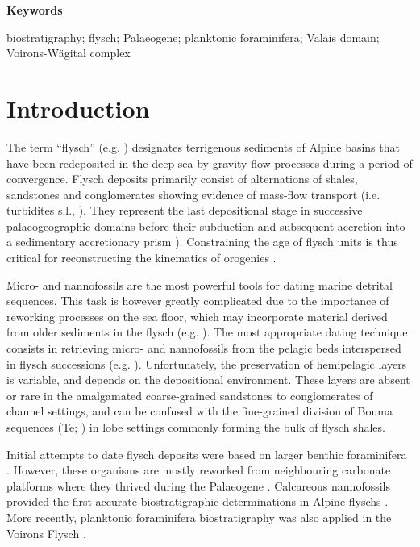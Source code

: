 \documentclass[twoside]{article}
\begin{document}
\begin{center}
{\small{\bf Keywords}\par
\smallskip
biostratigraphy; flysch; Palaeogene; planktonic foraminifera; Valais domain; Voirons-Wägital complex\par}
\end{center}

\section{Introduction}

The term “flysch” (e.g. \citealp{Studer1848,Wildi1987,Homewood1988}) designates terrigenous sediments of Alpine basins that have been redeposited in the deep sea by gravity-flow processes during a period of convergence. Flysch deposits primarily consist of alternations of shales, sandstones and conglomerates showing evidence of mass-flow transport (i.e. turbidites s.l., \citep{Mutti2009}). They represent the last depositional stage in successive palaeogeographic domains before their subduction and subsequent accretion into a sedimentary accretionary prism \citep{Kuenen1953,Homewood1988,Stampfli2002b}). Constraining the age of flysch units is thus critical for reconstructing the kinematics of orogenies \citep{Stampfli2002b,Stampfli2009,Handy2010}.\par
Micro- and nannofossils are the most powerful tools for dating marine detrital sequences. This task is however greatly complicated due to the importance of reworking processes on the sea floor, which may incorporate material derived from older sediments in the flysch (e.g. \citealp{Morel1980b,Mulder2001}). The most appropriate dating technique consists in retrieving micro- and nannofossils from the pelagic beds interspersed in flysch successions (e.g. \citealp{Ujetz1996}). Unfortunately, the preservation of hemipelagic layers is variable, and depends on the depositional environment. These layers are absent or rare in the amalgamated coarse-grained sandstones to conglomerates of channel settings, and can be confused with the fine-grained division of Bouma sequences (Te; \citealp{Bouma1962}) in lobe settings \citep{Mutti2003} commonly forming the bulk of flysch shales.\par
Initial attempts to date flysch deposits were based on larger benthic foraminifera \citep{Pilloud1936,Lombard1940a,Schaub1951,Rigassi1958,Cogulu1961,Schaub1965}. However, these organisms are mostly reworked from neighbouring carbonate platforms where they thrived during the Palaeogene \citep{Scheibner2008a}. Calcareous nannofossils provided the first accurate biostratigraphic determinations in Alpine flyschs \citep{Hekel1968,JanduChene1975c,Stuijvenberg1980a}. More recently, planktonic foraminifera biostratigraphy was also applied in the Voirons Flysch \citep{Ujetz1996,Frebourg2006,Ospina-Ostios2013,Ospina-Ostios2017}.\par
\end{document}
